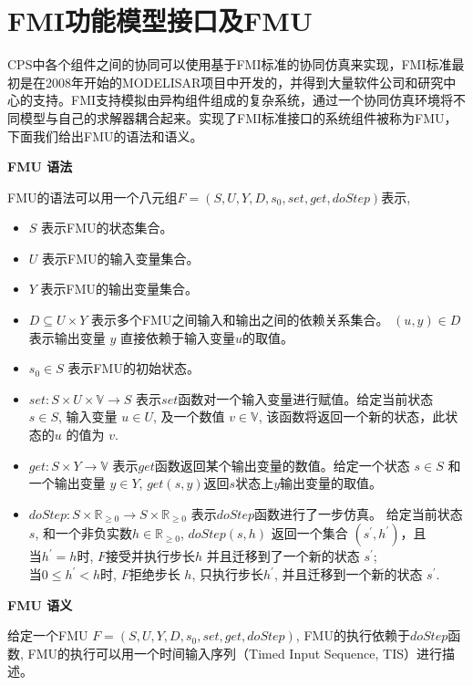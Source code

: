 \section{FMI功能模型接口及FMU}
CPS中各个组件之间的协同可以使用基于FMI标准的协同仿真来实现，FMI标准最初是在2008年开始的MODELISAR项目中开发的，并得到大量软件公司和研究中心的支持。FMI支持模拟由异构组件组成的复杂系统，通过一个协同仿真环境将不同模型与自己的求解器耦合起来。实现了FMI标准接口的系统组件被称为FMU，下面我们给出FMU的语法和语义。
\begin{define}
\textbf{FMU 语法}

FMU的语法可以用一个八元组$F=(S,U,Y,D,s_{0},set,get,doStep)$表示, 
\end{define}
\begin{itemize}
\item
$S$ 表示FMU的状态集合。
\item
$U$ 表示FMU的输入变量集合。
\item
$Y$ 表示FMU的输出变量集合。
\item
$D \subseteq U \times Y$ 表示多个FMU之间输入和输出之间的依赖关系集合。 $(u,y) \in D $表示输出变量 $y$ 直接依赖于输入变量$u$的取值。 
\item
$s_{0} \in S$ 表示FMU的初始状态。
\item
$set : S \times U \times \mathbb{V} \rightarrow S$ 表示$set$函数对一个输入变量进行赋值。给定当前状态 $s \in S$, 输入变量 $u \in U$, 及一个数值 $v \in \mathbb{V}$, 该函数将返回一个新的状态，此状态的$u$ 的值为 $v$.
\item
$get : S \times Y \rightarrow \mathbb{V}$ 表示$get$函数返回某个输出变量的数值。给定一个状态 $s \in S$ 和一个输出变量 $y \in Y$, $get(s,y)$返回$s$状态上$y$输出变量的取值。
\item
$doStep : S \times \mathbb{R}_{\geqslant{0}} \rightarrow S \times \mathbb{R}_{\geqslant{0}}$ 表示$doStep$函数进行了一步仿真。 给定当前状态 $s$, 和一个非负实数$h \in \mathbb{R}_{\geqslant{0}}$, $doStep(s,h)$ 返回一个集合 $(s^{\prime},h^{\prime})$，且
\\
    当$h^{\prime} = h$时, $F$接受并执行步长$h$ 并且迁移到了一个新的状态 $s^{\prime}$;
\\
    当$0 \leqslant h^{\prime} < h$时, $F$拒绝步长 $h$, 只执行步长$h^{\prime}$, 并且迁移到一个新的状态 $s^{\prime}$.
\end{itemize}
\begin{define}
\textbf{FMU 语义}
\end{define} 
给定一个FMU $F=(S,U,Y,D,s_{0},set,get,doStep)$, FMU的执行依赖于$doStep$函数, FMU的执行可以用一个时间输入序列（Timed Input Sequence, TIS）进行描述。

